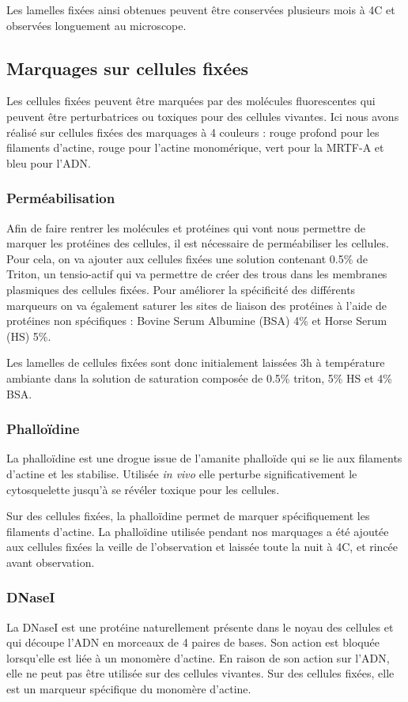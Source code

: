 	Les lamelles fixées ainsi obtenues peuvent être conservées plusieurs mois à 4\degres   C et observées longuement au microscope. 
	\subsection{Marquages sur cellules fixées}
	Les cellules fixées peuvent être marquées par des molécules fluorescentes qui peuvent être perturbatrices ou toxiques pour des cellules vivantes. Ici nous avons réalisé sur cellules fixées des marquages à 4 couleurs : rouge profond pour les filaments d'actine, rouge pour l'actine monomérique, vert pour la MRTF-A et bleu pour l'ADN. 
		\subsubsection{Perméabilisation}
		Afin de faire rentrer les molécules et protéines qui vont nous permettre de marquer les protéines des cellules, il est nécessaire de perméabiliser les cellules. Pour cela, on va ajouter aux cellules fixées une solution contenant 0.5\% de Triton, un tensio-actif qui va permettre de créer des trous dans les membranes plasmiques des cellules fixées. 
		Pour améliorer la spécificité des différents marqueurs on va également saturer les sites de liaison des protéines à l'aide de protéines non spécifiques : Bovine Serum Albumine (BSA) 4\% et Horse Serum (HS) 5\%. 
		
		Les lamelles de cellules fixées sont donc initialement laissées 3h à température ambiante dans la solution de saturation composée de 0.5\% triton, 5\% HS et 4\% BSA. 
		
		\subsubsection{Phalloïdine}
		La phalloïdine est une drogue issue de l'amanite phalloïde qui se lie aux filaments d'actine et les stabilise. Utilisée \emph{in vivo} elle perturbe significativement le cytosquelette jusqu'à se révéler toxique pour les cellules. 
		
		Sur des cellules fixées, la phalloïdine permet de marquer spécifiquement les filaments d'actine. La phalloïdine   utilisée pendant nos marquages a été ajoutée aux cellules fixées la veille de l'observation et laissée toute la nuit à 4\degres C, et rincée avant observation. 
		\subsubsection{DNaseI}
		La DNaseI est une protéine naturellement présente dans le noyau des cellules et qui découpe l'ADN en morceaux de 4 paires de bases. Son action est bloquée lorsqu'elle est liée à un monomère d'actine. En raison de son action sur l'ADN, elle ne peut pas être utilisée sur des cellules vivantes. Sur des cellules fixées, elle est un marqueur spécifique du monomère d'actine. 
		
